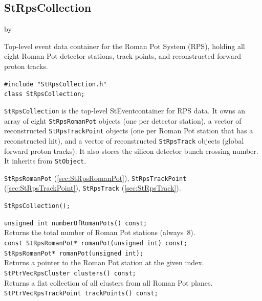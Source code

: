 \documentclass[twoside]{article}
\newcommand{\StEvent}{\textsf{StEvent}}
\newcommand{\entrylabel}[1]{\mbox{\textbf{{#1}}}\hfil}%
\newenvironment{entry}
{\begin{list}{}%
    {\renewcommand{\makelabel}{\entrylabel}%
     \setlength{\labelwidth}{90pt}%
     \setlength{\leftmargin}{\labelwidth}
     \advance\leftmargin by \labelsep%
      }%
    }%
  {\end{list}}
\newcommand{\Entrylabel}[1]%
{\raisebox{0pt}[1ex][0pt]{\makebox[\labelwidth][l]%
    {\parbox[t]{\labelwidth}{\hspace{0pt}\textbf{{#1}}}}}}
\newenvironment{Entry}%
{\renewcommand{\entrylabel}{\Entrylabel}\begin{entry}}%
  {\end{entry}}
\begin{document}
\subsection{StRpsCollection}
\label{sec:StRpsCollection}
\begin{Entry}
\item[Summary] Top-level event data container for the Roman Pot System (RPS),
    holding all eight Roman Pot detector stations, track points, and
    reconstructed forward proton tracks.
\item[Synopsis]
    \verb+#include "StRpsCollection.h"+\\
    \verb+class StRpsCollection;+\\
\item[Description]
    \texttt{StRpsCollection} is the top-level \StEvent container for RPS data.
    It owns an array of eight \texttt{StRpsRomanPot} objects (one per detector
    station), a vector of reconstructed \texttt{StRpsTrackPoint} objects (one
    per Roman Pot station that has a reconstructed hit), and a vector of
    reconstructed \texttt{StRpsTrack} objects (global forward proton tracks).
    It also stores the silicon detector bunch crossing number.
    It inherits from \texttt{StObject}.
\item[Related Classes]
    \texttt{StRpsRomanPot} (\ref{sec:StRpsRomanPot}),
    \texttt{StRpsTrackPoint} (\ref{sec:StRpsTrackPoint}),
    \texttt{StRpsTrack} (\ref{sec:StRpsTrack}).
\item[Public\\ Constructors]
    \verb+StRpsCollection();+\\
\item[Public Member\\ Functions]
    \verb+unsigned int numberOfRomanPots() const;+\\
    Returns the total number of Roman Pot stations (always~8).\\
    \verb+const StRpsRomanPot* romanPot(unsigned int) const;+\\
    \verb+StRpsRomanPot* romanPot(unsigned int);+\\
    Returns a pointer to the Roman Pot station at the given index.\\
    \verb+StPtrVecRpsCluster clusters() const;+\\
    Returns a flat collection of all clusters from all Roman Pot planes.\\
    \verb+StPtrVecRpsTrackPoint trackPoints() const;+\\

\end{Entry}
\end{document}
